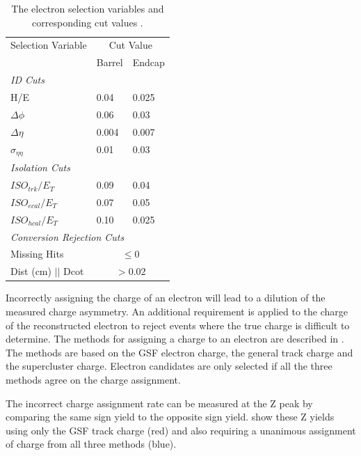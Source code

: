 \begin{table}[htbp]
  \begin{center}
    \leavevmode
    \begin{tabular}{lll} 
    \toprule
     Selection Variable & \multicolumn{2}{c}{Cut Value}\\
                        & Barrel & Endcap\\
\midrule 
  \multicolumn{3}{l}{\emph{ID Cuts}}\\
   H/E & 0.04 & 0.025 \\
  $\Delta\phi$ & 0.06 & 0.03 \\
  $\Delta\eta$ & 0.004 & 0.007  \\
  $\sigma_{\eta\eta}$ & 0.01 & 0.03 \\
  \midrule \multicolumn{3}{l}{\emph{Isolation Cuts}}\\
  $ISO_{trk} / E_T $  & 0.09 & 0.04 \\ 
  $ISO_{ecal}/ E_T$  & 0.07 & 0.05 \\
  $ISO_{hcal}/ E_T$  & 0.10 & 0.025 \\ 
  \midrule
   \multicolumn{3}{l}{\emph{Conversion Rejection Cuts}}\\
    Missing Hits  & \multicolumn{2}{c}{$\leq 0$}\\
    Dist (cm) $||$ Dcot   & \multicolumn{2}{c}{$>0.02$}\\
  \bottomrule 
  \end{tabular} 
  \caption[The electron selection variables and corresponding cut values.]
{\label{tab:electronselection}The electron selection variables and corresponding
cut values \cite{simplecutbasedeleid}.} 
  \end{center} 
\end{table}

Incorrectly assigning the charge of an electron will lead to a dilution of the
measured charge asymmetry.  An additional requirement is applied to the charge
of the reconstructed electron to reject events where the true charge is
difficult to determine.  The methods for assigning a charge to an electron are
described in . The methods are based on the GSF electron
charge, the general track charge and the supercluster charge.
Electron candidates are only selected if all the three methods agree on the
charge assignment.

The incorrect charge assignment rate can be measured at the Z peak by comparing
the same sign \HepProcess{\PZ\to\Pepm\Pepm} yield to the opposite sign
\HepProcess{\PZ\to\Pelectron\APelectron} yield.  show these
Z yields using only the {GSF} track charge (red) and also requiring a unanimous
assignment of charge from all three methods (blue). 

